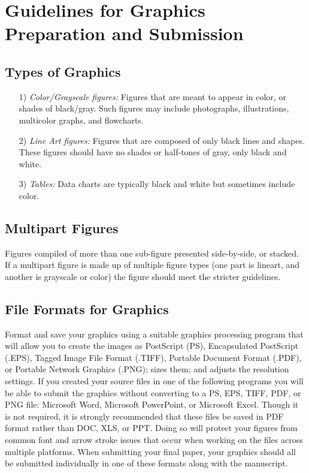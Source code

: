 \documentclass[journal]{IEEEtran}
\begin{document}
\section{Guidelines for Graphics Preparation and Submission}

\subsection{Types of Graphics}

\begin{enumerate}
\item[1)]{\it Color/Grayscale figures:} Figures that are meant to appear in color, or shades of black/gray. Such figures may include photographs, 
         illustrations, multicolor graphs, and flowcharts.
\item[2)]{\it Line Art figures:} Figures that are composed of only black lines and shapes. These figures should have no shades or half-tones of gray, only black and white.
\item[3)]{\it Tables:} Data charts are typically black and white but sometimes include color.
\end{enumerate}

\subsection{Multipart Figures}
Figures compiled of more than one sub-figure presented side-by-side, or stacked. If a multipart figure is made up of multiple figure types (one part is lineart, and another is grayscale or color) the figure should meet the stricter guidelines.

\subsection{File Formats for Graphics}

Format and save your graphics using a suitable graphics processing program that will allow you to create the images as PostScript (PS), Encapsulated PostScript (.EPS), Tagged Image File Format (.TIFF), Portable Document Format (.PDF), or Portable Network Graphics (.PNG); sizes them; and adjusts the resolution settings. If you created your source files in one of the following programs you will be able to submit the graphics without converting to a PS, EPS, TIFF, PDF, or PNG file: Microsoft Word, Microsoft PowerPoint, or Microsoft Excel. Though it is not required, it is strongly recommended that these files be saved in PDF format rather than DOC, XLS, or PPT. Doing so will protect your figures from common font and arrow stroke issues that occur when working on the files across multiple platforms. When submitting your final paper, your graphics should all be submitted individually in one of these formats along with the manuscript.
\end{document}
